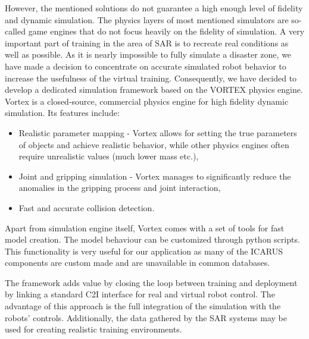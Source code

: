 \documentclass{article}
\begin{document}
However, the mentioned solutions do not guarantee a high enough level of fidelity and dynamic simulation.
The physics layers of most mentioned simulators are so-called game engines that do not focus heavily on the fidelity of simulation.
A very important part of training in the area of SAR is to recreate real conditions as well as possible.
As it is nearly impossible to fully simulate a disaster zone, we have made a decision to concentrate on accurate simulated robot behavior to increase the usefulness of the virtual training.
Consequently, we have decided to develop a dedicated simulation framework based on the VORTEX physics engine.
Vortex is a closed-source, commercial physics engine for high fidelity dynamic simulation.
Its features include:
\begin{itemize}
\item Realistic parameter mapping - Vortex allows for setting the true parameters of objects and achieve realistic behavior, while other physics engines often require unrealistic values (much lower mass etc.),
\item Joint and gripping simulation - Vortex manages to significantly reduce the anomalies in the gripping process and joint interaction,
\item Fast and accurate collision detection.
\end{itemize}
Apart from simulation engine itself, Vortex comes with a set of tools for fast model creation.
The model behaviour can be customized through python scripts.
This functionality is very useful for our application as many of the ICARUS components are custom made and are unavailable in  common databases.


The framework adds value by closing the loop between training and deployment by linking a standard C2I interface for real and virtual robot control.
The advantage of this approach is the full integration of the simulation with the robots' controls. Additionally, the data gathered by the SAR systems may be used for creating realistic training environments.
\end{document}
